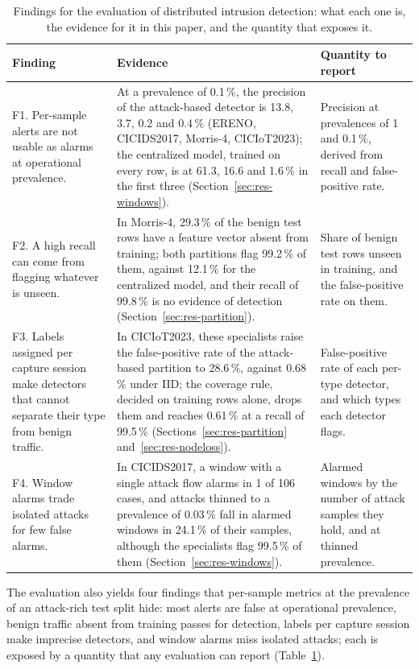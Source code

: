 \begin{table}[t]
\caption{Findings for the evaluation of distributed intrusion detection: what each one is, the
evidence for it in this paper, and the quantity that exposes it.}
\label{tab:findings}
\small
\begin{tabular}{@{}p{}p{}p{}@{}}
\toprule
Finding & Evidence & Quantity to report \\
\midrule
F1. Per-sample alerts are not usable as alarms at operational prevalence. &
At a prevalence of 0.1\,\%, the precision of the attack-based detector is 13.8, 3.7, 0.2 and
0.4\,\% (ERENO, CICIDS2017, Morris-4, CICIoT2023); the centralized model, trained on every row, is
at 61.3, 16.6 and 1.6\,\% in the first three (Section~\ref{sec:res-windows}). &
Precision at prevalences of 1 and 0.1\,\%, derived from recall and false-positive rate. \\
F2. A high recall can come from flagging whatever is unseen. &
In Morris-4, 29.3\,\% of the benign test rows have a feature vector absent from training; both
partitions flag 99.2\,\% of them, against 12.1\,\% for the centralized model, and their recall of
99.8\,\% is no evidence of detection (Section~\ref{sec:res-partition}). &
Share of benign test rows unseen in training, and the false-positive rate on them. \\
F3. Labels assigned per capture session make detectors that cannot separate their type from benign
traffic. &
In CICIoT2023, these specialists raise the false-positive rate of the attack-based partition to
28.6\,\%, against 0.68\,\% under IID; the coverage rule, decided on training rows alone, drops them
and reaches 0.61\,\% at a recall of 99.5\,\% (Sections~\ref{sec:res-partition}
and~\ref{sec:res-nodeloss}). &
False-positive rate of each per-type detector, and which types each detector flags. \\
F4. Window alarms trade isolated attacks for few false alarms. &
In CICIDS2017, a window with a single attack flow alarms in 1 of 106 cases, and attacks thinned to
a prevalence of 0.03\,\% fall in alarmed windows in 24.1\,\% of their samples, although the
specialists flag 99.5\,\% of them (Section~\ref{sec:res-windows}). &
Alarmed windows by the number of attack samples they hold, and at thinned prevalence. \\
\bottomrule
\end{tabular}
\end{table}

The evaluation also yields four findings that per-sample metrics at the prevalence of an
attack-rich test split hide: most alerts are false at operational prevalence, benign traffic
absent from training passes for detection, labels per capture session make imprecise
detectors, and window alarms miss isolated attacks; each is exposed by a quantity that any
evaluation can report (Table~\ref{tab:findings}).

